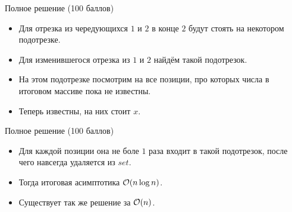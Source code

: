 \begin{frame}{Полное решение (100 баллов)}
  \begin{itemize}
  \item Для отрезка из чередующихся $1$ и $2$ в конце $2$ будут стоять на некотором подотрезке.
  \item Для изменившегося отрезка из $1$ и $2$ найдём такой подотрезок.
  \item На этом подотрезке посмотрим на все позиции, про которых числа в итоговом массиве пока не известны.
  \item Теперь известны, на них стоит $x$.
  \end{itemize}
\end{frame}

\begin{frame}{Полное решение (100 баллов)}
  \begin{itemize}
  \item Для каждой позиции она не боле $1$ раза входит в такой подотрезок, после чего навсегда удаляется из $set$.
  \item Тогда итоговая асимптотика $\mathcal{O}(n \log n)$.
  \item Существует так же решение за $\mathcal{O}(n)$.
  \end{itemize}
\end{frame}
